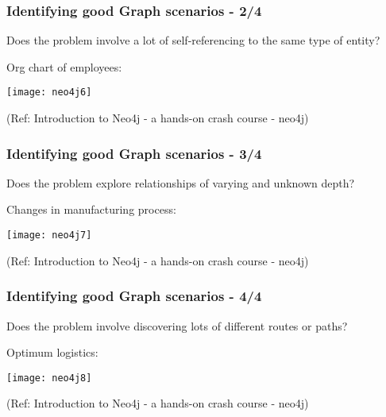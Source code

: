 \begin{frame}\frametitle{Identifying good Graph scenarios - 2/4}

Does the problem involve a lot of self-referencing to the same type of entity?

Org chart of employees:

\begin{center}
\texttt{[image: neo4j6]}
\end{center}	  

{\tiny (Ref: Introduction to Neo4j - a hands-on crash course - neo4j)}
\end{frame}

\begin{frame}\frametitle{Identifying good Graph scenarios - 3/4}

Does the problem explore relationships of varying and unknown depth?

Changes in manufacturing process:

\begin{center}
\texttt{[image: neo4j7]}
\end{center}	  

{\tiny (Ref: Introduction to Neo4j - a hands-on crash course - neo4j)}
\end{frame}

\begin{frame}\frametitle{Identifying good Graph scenarios - 4/4}

Does the problem involve discovering lots of different routes or paths?

Optimum logistics:

\begin{center}
\texttt{[image: neo4j8]}
\end{center}	  

{\tiny (Ref: Introduction to Neo4j - a hands-on crash course - neo4j)}
\end{frame}


